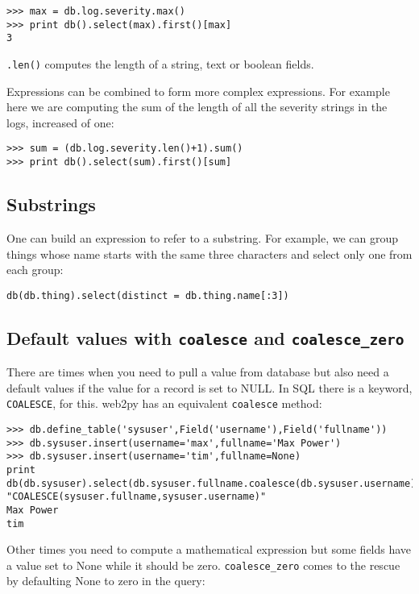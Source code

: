 \documentclass[justified,sixbynine,notoc]{tufte-book}
\def\ft{\small\tt}
\begin{document}
\begin{fullwidth}
\begin{lstlisting}
>>> max = db.log.severity.max()
>>> print db().select(max).first()[max]
3
\end{lstlisting}

{\ft .len()} computes the length of a string, text or boolean fields.

Expressions can be combined to form more complex expressions. For example here we are computing the sum of the length of all the severity strings in the logs, increased of one:

\begin{lstlisting}
>>> sum = (db.log.severity.len()+1).sum()
>>> print db().select(sum).first()[sum]
\end{lstlisting}

\goodbreak\subsection{Substrings}

One can build an expression to refer to a substring. For example, we can group things whose name starts with the same three characters and select only one from each group:

\begin{lstlisting}
db(db.thing).select(distinct = db.thing.name[:3])
\end{lstlisting}

\goodbreak\subsection{Default values with {\ft coalesce} and {\ft coalesce\_zero}}

There are times when you need to pull a value from database but also need a default values if the value for a record is set to NULL. In SQL there is a keyword, {\ft COALESCE}, for this. web2py has an equivalent {\ft coalesce} method:

\begin{lstlisting}
>>> db.define_table('sysuser',Field('username'),Field('fullname'))
>>> db.sysuser.insert(username='max',fullname='Max Power')
>>> db.sysuser.insert(username='tim',fullname=None)
print db(db.sysuser).select(db.sysuser.fullname.coalesce(db.sysuser.username))
"COALESCE(sysuser.fullname,sysuser.username)"
Max Power
tim
\end{lstlisting}

Other times you need to compute a mathematical expression but some fields have a value set to None while it should be zero.
{\ft coalesce\_zero} comes to the rescue by defaulting None to zero in the query:


\end{fullwidth}
\end{document}
